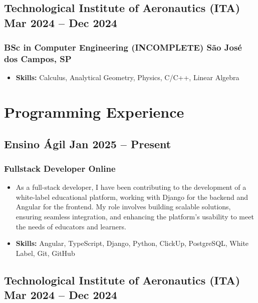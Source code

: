 \documentclass[11pt]{article}
\begin{document}
\subsection{ Technological Institute of Aeronautics (ITA) \hfill  Mar 2024  -- Dec 2024   }
\subsubsection{ BSc in Computer Engineering (INCOMPLETE) \hfill São José dos Campos, SP }
\vspace{10pt} %
\begin{itemize}
    
    \item \textbf{Skills:}  Calculus, Analytical Geometry, Physics, C/C++, Linear Algebra
    
    
\end{itemize}


\section{Programming Experience}

\subsection{ Ensino Ágil \hfill  Jan 2025  -- Present   }
\subsubsection{ Fullstack Developer \hfill Online }
\vspace{10pt} %
\begin{itemize}
    \item As a full-stack developer, I have been contributing to the development of a white-label educational platform, working with Django for the backend and Angular for the frontend. My role involves building scalable solutions, ensuring seamless integration, and enhancing the platform's usability to meet the needs of educators and learners.
    
    \item \textbf{Skills:}  Angular, TypeScript, Django, Python, ClickUp, PostgreSQL, White Label, Git, GitHub
    
\end{itemize}

\subsection{ Technological Institute of Aeronautics (ITA) \hfill  Mar 2024  -- Dec 2024   }
\end{document}
